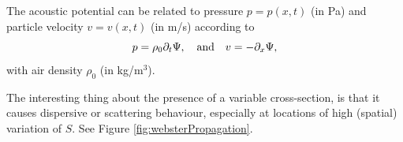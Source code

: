 The acoustic potential can be related to pressure $p = p(x,t)$ (in Pa) and particle velocity $v = v(x,t)$ (in m/s) according to \cite{Bilbao2018}
\begin{equation}\label{eq:pressureVelocityWebster}
    p = \rho_0 \partial_t \Psi, \quad \text{and} \quad v = -\partial_x \Psi,
\end{equation}
with air density $\rho_0$ (in kg/m$^3$).

The interesting thing about the presence of a variable cross-section, is that it causes dispersive or scattering behaviour, especially at locations of high (spatial) variation of $S$. See Figure \ref{fig:websterPropagation}.%

